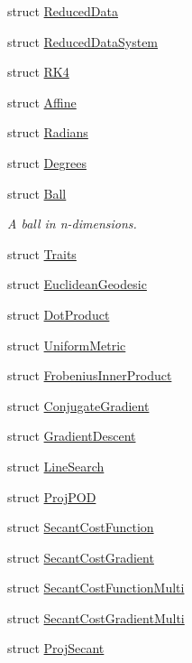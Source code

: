 \begin{DoxyCompactItemize}
\item 
struct \hyperlink{struct_d_r_d_s_p_1_1_reduced_data}{Reduced\-Data}
\item 
struct \hyperlink{struct_d_r_d_s_p_1_1_reduced_data_system}{Reduced\-Data\-System}
\item 
struct \hyperlink{struct_d_r_d_s_p_1_1_r_k4}{R\-K4}
\item 
struct \hyperlink{struct_d_r_d_s_p_1_1_affine}{Affine}
\item 
struct \hyperlink{struct_d_r_d_s_p_1_1_radians}{Radians}
\item 
struct \hyperlink{struct_d_r_d_s_p_1_1_degrees}{Degrees}
\item 
struct \hyperlink{struct_d_r_d_s_p_1_1_ball}{Ball}
\begin{DoxyCompactList}\small\item\em A ball in n-\/dimensions. \end{DoxyCompactList}\item 
struct \hyperlink{struct_d_r_d_s_p_1_1_traits}{Traits}
\item 
struct \hyperlink{struct_d_r_d_s_p_1_1_euclidean_geodesic}{Euclidean\-Geodesic}
\item 
struct \hyperlink{struct_d_r_d_s_p_1_1_dot_product}{Dot\-Product}
\item 
struct \hyperlink{struct_d_r_d_s_p_1_1_uniform_metric}{Uniform\-Metric}
\item 
struct \hyperlink{struct_d_r_d_s_p_1_1_frobenius_inner_product}{Frobenius\-Inner\-Product}
\item 
struct \hyperlink{struct_d_r_d_s_p_1_1_conjugate_gradient}{Conjugate\-Gradient}
\item 
struct \hyperlink{struct_d_r_d_s_p_1_1_gradient_descent}{Gradient\-Descent}
\item 
struct \hyperlink{struct_d_r_d_s_p_1_1_line_search}{Line\-Search}
\item 
struct \hyperlink{struct_d_r_d_s_p_1_1_proj_p_o_d}{Proj\-P\-O\-D}
\item 
struct \hyperlink{struct_d_r_d_s_p_1_1_secant_cost_function}{Secant\-Cost\-Function}
\item 
struct \hyperlink{struct_d_r_d_s_p_1_1_secant_cost_gradient}{Secant\-Cost\-Gradient}
\item 
struct \hyperlink{struct_d_r_d_s_p_1_1_secant_cost_function_multi}{Secant\-Cost\-Function\-Multi}
\item 
struct \hyperlink{struct_d_r_d_s_p_1_1_secant_cost_gradient_multi}{Secant\-Cost\-Gradient\-Multi}
\item 
struct \hyperlink{struct_d_r_d_s_p_1_1_proj_secant}{Proj\-Secant}
\end{DoxyCompactItemize}
